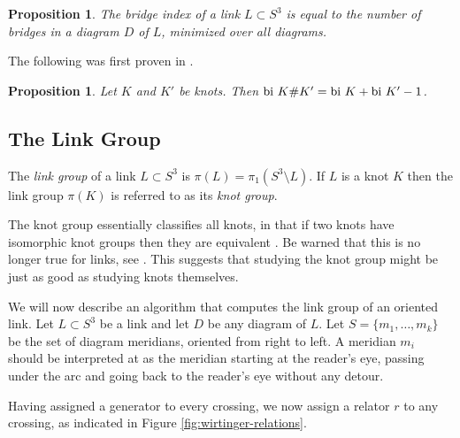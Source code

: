\documentclass{article}
\newtheorem{proposition}[theorem]{Proposition}
\theoremstyle{definition}
\begin{document}
\begin{proposition}
The bridge index of a link $L \subset S^3$ is equal to the number of bridges in a diagram $D$ of $L$, minimized over all diagrams.
\end{proposition}



The following was first proven in \cite{schubert1954}.

\begin{proposition}\label{prop:bridge-index-connected-sum}
Let $K$ and $K'$ be knots. Then $\textup{bi } K\#K' = \textup{bi } K + \textup{bi }K' - 1$.
\end{proposition}


\subsection{The Link Group}\label{subsec:link-group}
The \textit{link group} of a link $L \subset S^3$ is $\pi(L) = \pi_1(S^3 \setminus L)$. If $L$ is a knot $K$ then the link group $\pi(K)$ is referred to as its \textit{knot group}.

The knot group essentially classifies all knots, in that if two knots have isomorphic knot groups then they are equivalent \cite{gordon1989}. Be warned that this is no longer true for links, see \cite{rolfsen2003}. This suggests that studying the knot group might be just as good as studying knots themselves.

We will now describe an algorithm that computes the link group of an oriented link. Let $L \subset S^3$ be a link and let $D$ be any diagram of $L$. Let $S = \{m_1, \dots, m_k\}$ be the set of diagram meridians, oriented from right to left. A meridian $m_i$ should be interpreted at as the meridian starting at the reader's eye, passing under the arc and going back to the reader's eye without any detour.

Having assigned a generator to every crossing, we now assign a relator $r$ to any crossing, as indicated in Figure \ref{fig:wirtinger-relations}.
\end{document}
